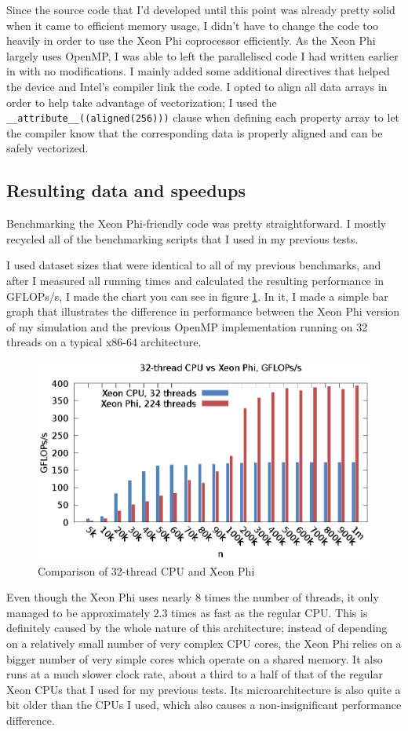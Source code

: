 \documentclass[journal]{IEEEtran}
\begin{document}
			Since the source code that I'd developed until this point was already pretty solid when it came to efficient memory usage, I didn't have to change the code too heavily in order to use the Xeon Phi coprocessor efficiently. As the Xeon Phi largely uses OpenMP, I was able to left the parallelised code I had written earlier in with no modifications. I mainly added some additional directives that helped the device and Intel's compiler link the code. I opted to align all data arrays in order to help take advantage of vectorization; I used the \texttt{\_\_attribute\_\_((aligned(256)))} clause when defining each property array to let the compiler know that the corresponding data is properly aligned and can be safely vectorized.
			
		\subsection*{Resulting data and speedups}
		
			Benchmarking the Xeon Phi-friendly code was pretty straightforward. I mostly recycled all of the benchmarking scripts that I used in my previous tests. 
			
			I used dataset sizes that were identical to all of my previous benchmarks, and after I measured all running times and calculated the resulting performance in GFLOPs/s, I made the chart you can see in figure \ref{32_vs_phi}. In it, I made a simple bar graph that illustrates the difference in performance between the Xeon Phi version of my simulation and the previous OpenMP implementation running on 32 threads on a typical x86-64 architecture.
			
			\begin{figure}[ht]			
				\centering
				\includegraphics[width=.5\textwidth]{gnuplot/phi_vs_32.eps}
				\caption{\label{32_vs_phi}Comparison of 32-thread CPU and Xeon Phi}
			\end{figure} 
			
			Even though the Xeon Phi uses nearly 8 times the number of threads, it only managed to be approximately $2.3$ times as fast as the regular CPU. This is definitely caused by the whole nature of this architecture; instead of depending on a relatively small number of very complex CPU cores, the Xeon Phi relies on a bigger number of very simple cores which operate on a shared memory. It also runs at a much slower clock rate, about a third to a half of that of the regular Xeon CPUs that I used for my previous tests. Its microarchitecture is also quite a bit older than the CPUs I used, which also causes a non-insignificant performance difference.			
			
\end{document}
